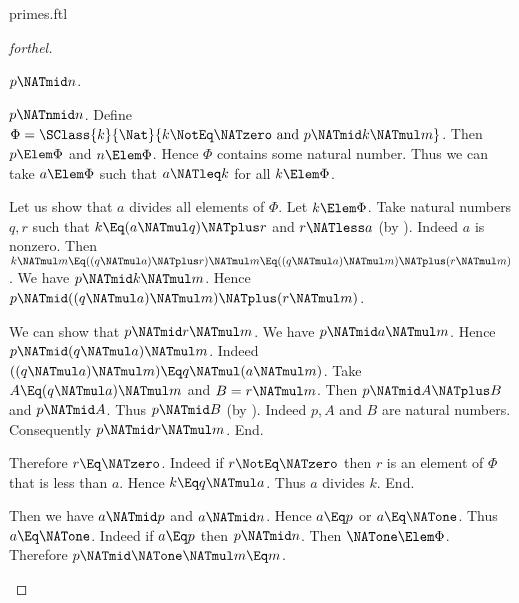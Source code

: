 \documentclass{stex}
\begin{document}
\begin{smodule}{primes.ftl}
\begin{proof}[forthel]
  \begin{case}{$p \NATmid n$.} \end{case}

  \begin{case}{$p \NATnmid n$.}
    Define $\Phi = \SClass{k}{\Nat}{k \NotEq \NATzero\text{ and }p \NATmid k \NATmul m}$.
    Then $p \Elem \Phi$ and $n \Elem \Phi$.
    Hence $\Phi$ contains some natural number.
    Thus we can take $a \Elem \Phi$ such that $a \NATleq k$ for all $k \Elem \Phi$.

    Let us show that $a$ divides all elements of $\Phi$.
      Let $k \Elem \Phi$.
      Take natural numbers $q, r$ such that $k \Eq (a \NATmul q) \NATplus r$ and $r \NATless a$ (by ).
      Indeed $a$ is nonzero.
      Then $k \NATmul m
        \Eq ((q \NATmul a) \NATplus r) \NATmul m
        \Eq ((q \NATmul a) \NATmul m) \NATplus (r \NATmul m)$.
      We have $p \NATmid k \NATmul m$.
      Hence $p \NATmid ((q \NATmul a) \NATmul m) \NATplus (r \NATmul m)$.

      We can show that $p \NATmid r \NATmul m$.
        We have $p \NATmid a \NATmul m$.
        Hence $p \NATmid (q \NATmul a) \NATmul m$.
        Indeed $((q \NATmul a) \NATmul m) \Eq q \NATmul (a \NATmul m)$. %
        Take $A \Eq (q \NATmul a) \NATmul m$ and $B = r \NATmul m$. %
        Then $p \NATmid A \NATplus B$ and $p \NATmid A$.
        Thus $p \NATmid B$ (by ).
        Indeed $p, A$ and $B$ are natural numbers.
        Consequently $p \NATmid r \NATmul m$.
      End.

      Therefore $r \Eq \NATzero$.
      Indeed if $r \NotEq \NATzero$ then $r$ is an element of $\Phi$ that is less than $a$.
      Hence $k \Eq q \NATmul a$.
      Thus $a$ divides $k$.
    End.

    Then we have $a \NATmid p$ and $a \NATmid n$.
    Hence $a \Eq p$ or $a \Eq \NATone$.
    Thus $a \Eq \NATone$.
    Indeed if $a \Eq p$ then $p \NATmid n$.
    Then $\NATone \Elem \Phi$.
    Therefore $p \NATmid \NATone \NATmul m \Eq m$.
  \end{case}
\end{proof}
\end{smodule}
\end{document}
